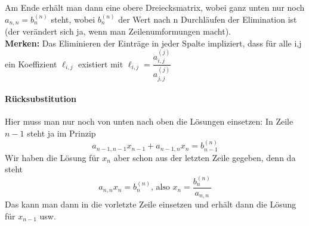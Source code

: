 			Am Ende erhält man dann eine obere Dreiecksmatrix, wobei ganz unten nur noch $ a_{n,n} = b_n^{(n)} $ steht, wobei $ b_n^{(n)} $ der Wert nach n Durchläufen der Elimination ist (der verändert sich ja, wenn man Zeilenumformungen macht).\\
			\textbf{Merken:} Das Eliminieren der Einträge in jeder Spalte impliziert, dass für alle i,j ein Koeffizient $ \ell_{i,j} $ existiert mit $ \ell_{i,j} = \dfrac{a_{i,j}^{(j)}}{a_{j,j}^{(j)}}  $
			
			\paragraph{Rücksubstitution} Hier muss man nur noch von unten nach oben die Lösungen einsetzen: 
			In Zeile $ n-1 $ steht ja im Prinzip
			$$ a_{n-1,n-1}x_{n-1} + a_{n-1,n}x_n = b_{n-1}^{(n)} $$
			Wir haben die Lösung für $ x_n $ aber schon aus der letzten Zeile gegeben, denn da steht
			$$ a_{n,n}x_n = b_n^{(n)} \text{, also }  x_n = \frac{b_n^{(n)}}{a_{n,n}} $$
			Das kann man dann in die vorletzte Zeile einsetzen und erhält dann die Lösung für $ x_{n-1} $ usw.
			
			
			